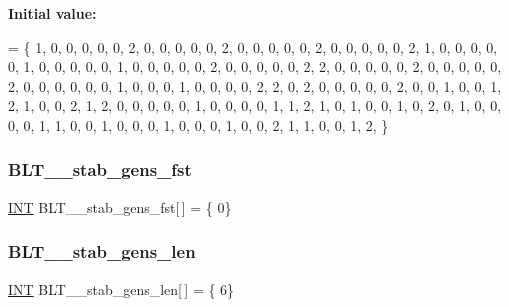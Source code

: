 {\bfseries Initial value\+:}
\begin{DoxyCode}
= \{
1, 0, 0, 0, 0, 0, 2, 0, 0, 0, 0, 0, 2, 0, 0, 0, 0, 0, 2, 0, 0, 0, 0, 0, 2, 
1, 0, 0, 0, 0, 0, 1, 0, 0, 0, 0, 0, 1, 0, 0, 0, 0, 0, 2, 0, 0, 0, 0, 0, 2, 
2, 0, 0, 0, 0, 0, 2, 0, 0, 0, 0, 0, 2, 0, 0, 0, 0, 0, 0, 1, 0, 0, 0, 1, 0, 
0, 0, 0, 2, 2, 0, 2, 0, 0, 0, 0, 0, 2, 0, 0, 1, 0, 0, 1, 2, 1, 0, 0, 2, 1, 
2, 0, 0, 0, 0, 0, 1, 0, 0, 0, 0, 1, 1, 2, 1, 0, 1, 0, 0, 1, 0, 2, 0, 1, 0, 
0, 0, 0, 1, 1, 0, 0, 1, 0, 0, 0, 1, 0, 0, 0, 1, 0, 0, 2, 1, 1, 0, 0, 1, 2, 
\}
\end{DoxyCode}
\mbox{\label{data___b_l_t_8_c_a851644ea65473a48bf9d371d7d965a4b}} 
\subsubsection{\texorpdfstring{B\+L\+T\+\_\+\_\+stab\+\_\+gens\+\_\+fst}{BLT\_3\_stab\_gens\_fst}}
{\footnotesize\ttfamily \mbox{\hyperlink{galois_8h_a09fddde158a3a20bd2dcadb609de11dc}{I\+NT}} B\+L\+T\+\_\+\_\+stab\+\_\+gens\+\_\+fst\mbox{[}$\,$\mbox{]} = \{ 0\}}

\mbox{\label{data___b_l_t_8_c_a3e10816189bb7f4061f40679a0b581c1}} 
\subsubsection{\texorpdfstring{B\+L\+T\+\_\+\_\+stab\+\_\+gens\+\_\+len}{BLT\_3\_stab\_gens\_len}}
{\footnotesize\ttfamily \mbox{\hyperlink{galois_8h_a09fddde158a3a20bd2dcadb609de11dc}{I\+NT}} B\+L\+T\+\_\+\_\+stab\+\_\+gens\+\_\+len\mbox{[}$\,$\mbox{]} = \{ 6\}}

\mbox{\label{data___b_l_t_8_c_aa976176410422e38132b321c8bf95e98}} 
